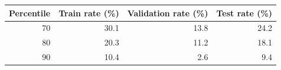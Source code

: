 \begin{tabular}{rrrr}
\toprule
Percentile & Train rate (\%) & Validation rate (\%) & Test rate (\%) \\
\midrule
70 & 30.1 & 13.8 & 24.2 \\
80 & 20.3 & 11.2 & 18.1 \\
90 & 10.4 & 2.6 & 9.4 \\
\bottomrule
\end{tabular}
